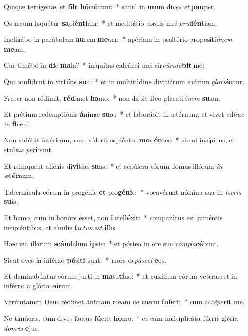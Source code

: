 \item Quique terrígenæ, et \textbf{fí}lii \textbf{hó}\textbf{mi}num:~* simul in unum di\textit{ves} \textit{et} \textbf{pau}per.
\item Os meum loquétur \textbf{sa}pi\textbf{én}\textbf{ti}am:~* et meditátio cordis me\textit{i} \textit{pru}\textbf{dén}tiam.
\item Inclinábo in parábolam \textbf{au}rem \textbf{me}am:~* apériam in psaltério propositi\textit{ó}\textit{nem} \textbf{me}am.
\item Cur timébo in \textbf{di}e \textbf{ma}la?~* iníquitas calcánei mei cir\textit{cúm}\textit{da}\textbf{bit} me:
\item Qui confídunt in vir\textbf{tú}te \textbf{su}a:~* et in multitúdine divitiárum suárum \textit{glo}\textit{ri}\textbf{án}tur.
\item Frater non rédimit, \textbf{réd}imet \textbf{ho}mo:~* non dabit Deo placati\textit{ó}\textit{nem} \textbf{su}am.
\item Et prétium redemptiónis \textbf{á}nimæ \textbf{su}æ:~* et laborábit in ætérnum, et vivet ad\textit{huc} \textit{in} \textbf{fi}nem.
\item Non vidébit intéritum, cum víderit sapiéntes \textbf{mo}ri\textbf{én}tes:~* simul insípiens, et stul\textit{tus} \textit{per}\textbf{í}bunt.
\item Et relínquent aliénis di\textbf{ví}tias \textbf{su}as:~* et sepúlcra eórum domus illórum \textit{in} \textit{æ}\textbf{tér}num.
\item Tabernácula eórum in progénie \textbf{et} pro\textbf{gé}\textbf{ni}e:~* vocavérunt nómina sua in \textit{ter}\textit{ris} \textbf{su}is.
\item Et homo, cum in honóre esset, non \textbf{in}tel\textbf{lé}xit:~* comparátus est juméntis insipiéntibus, et símilis fac\textit{tus} \textit{est} \textbf{il}lis.
\item Hæc via illórum \textbf{scán}dalum \textbf{ip}sis:~* et póstea in ore suo \textit{com}\textit{pla}\textbf{cé}bunt.
\item Sicut oves in inférno \textbf{pó}si\textbf{ti} sunt:~* mors de\textit{pá}\textit{scet} \textbf{e}os.
\item Et dominabúntur eórum justi in \textbf{ma}tu\textbf{tí}no:~* et auxílium eórum veteráscet in inférno a glóri\textit{a} \textit{e}\textbf{ó}rum.
\item Verúmtamen Deus rédimet ánimam meam de \textbf{ma}nu \textbf{ín}\textbf{fe}ri:~* cum ac\textit{cé}\textit{pe}\textbf{rit} me.
\item Ne timúeris, cum dives factus \textbf{fú}erit \textbf{ho}mo:~* et cum multiplicáta fúerit glória \textit{do}\textit{mus} \textbf{e}jus.
